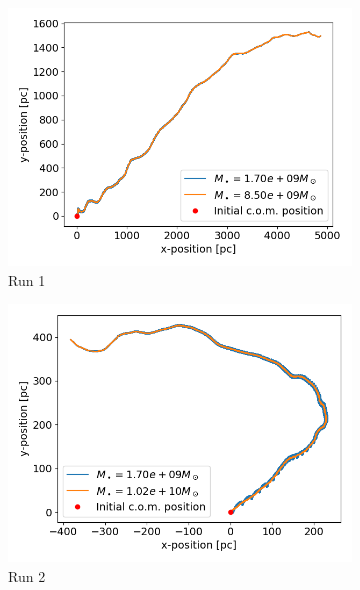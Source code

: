 \documentclass[english, oneside]{HYgradu}
\begin{document}
\begin{figure}
	\centering
	\begin{subfigure}[b]{0.49\textwidth}
		\includegraphics[width=\textwidth]{Run1_Trajectory_small.png}
		\caption{Run 1}
	\end{subfigure}
	\begin{subfigure}[b]{0.49\textwidth}
		\includegraphics[width=\textwidth]{Run2_Trajectory_small.png}
		\caption{Run 2}
	\end{subfigure}
	\begin{subfigure}[b]{0.49\textwidth}

\end{subfigure}
\end{figure}
\end{document}
